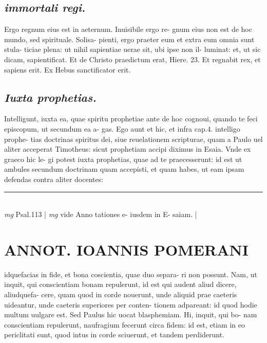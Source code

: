 \documentclass{article}
\begin{document}
\begin{pages}
\subsection*{\textit{immortali regi. }}\pstart Ergo regnum eius est in aeternum. Inuisibile ergo re- gnum eius non est de hoc mundo, sed spirituale. Solisa- pienti, ergo praeter eum et extra eum omnia sunt stula- ticiae plena: ut nihil sapientiae uerae sit, ubi ipse non il- luminat: et, ut sic dicam, sapientificat. Et de Christo praedictum erat, Hiere. 23. Et regnabit rex, et sapiens erit. Ex Hebus  sanctificator erit.  \pend
{}
{}
\subsection*{\textit{Iuxta prophetias. }}\pstart Intelligunt, iuxta ea, quae spiritu prophetiae ante de hoc cognoui, quando te feci episcopum, ut secundum ea a- gas. Ego aunt et hic, et infra cap.4. intelligo prophe- tias doctrinas spiritus dei, siue reuelationem scripturae, quam a Paulo uel aliter acceperat Timotheus: sicut prophetiam accipi diximus in Esaia. Vnde ex graeco hic le- gi potest iuxta prophetias, quae ad te praecesserunt: id est ut ambules secundum doctrinam quam accepisti, et quam habes, ut eam ipsam defendas contra aliter docentes:  \pend
\vspace{0.5cm}\noindent
\vspace{0.2cm}\rule{1cm}{0.2pt}\\ 
\hspace{0.2cm}\textit{mg}
\footnotesize Psal.113 
\normalsize| 
\hspace{0.2cm}\textit{mg}
\footnotesize vide Anno tationes e- iusdem in E- saiam. 
\normalsize| 
\section*{ANNOT. IOANNIS POMERANI }\pstart idquefacias in fide, et bona coscientia, quae duo separa- ri non possunt. Nam, ut inquit, qui conscientiam bonam repulerunt, id est qui audent aliud dicere, aliudquefa- cere, quam quod in corde nouerunt, unde aliquid prae caeteris uideantur, unde caeteris superiores per conten- tionem adpareant: id quod hodie multum uulgare est. Sed Paulus hic uocat blasphemiam. Hi, inquit, qui bo- nam conscientiam repulerunt, naufragium fecerunt circa fidem: id est, etiam in eo periclitati sunt, quod intus in corde sciuerunt, et tandem perdiderunt.  \pend
{}
{}

\end{pages}
\end{document}

